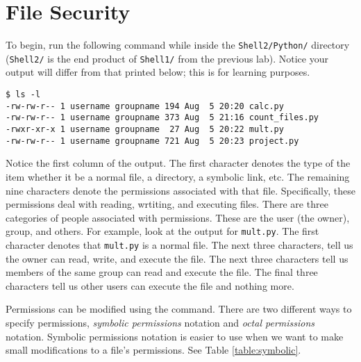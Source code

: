 

\section*{File Security} %

To begin, run the following command while inside the \texttt{Shell2/Python/} directory (\texttt{Shell2/} is the end product of \texttt{Shell1/} from the previous lab).
Notice your output will differ from that printed below; this is for learning purposes.

\begin{lstlisting}
$ ls -l
-rw-rw-r-- 1 username groupname 194 Aug  5 20:20 calc.py
-rw-rw-r-- 1 username groupname 373 Aug  5 21:16 count_files.py
-rwxr-xr-x 1 username groupname  27 Aug  5 20:22 mult.py
-rw-rw-r-- 1 username groupname 721 Aug  5 20:23 project.py
\end{lstlisting}

Notice the first column of the output.
The first character denotes the type of the item whether it be a normal file, a directory, a symbolic link, etc.
The remaining nine characters denote the permissions associated with that file.
Specifically, these permissions deal with reading, wrtiting, and executing files.
There are three categories of people associated with permissions.
These are the user (the owner), group, and others.
For example, look at the output for \texttt{mult.py}.
The first character \li{-} denotes that \texttt{mult.py} is a normal file.
The next three characters,  tell us the owner can read, write, and execute the file.
The next three characters  tell us members of the same group can read and execute the file.
The final three characters  tell us other users can execute the file and nothing more.

Permissions can be modified using the  command.
There are two different ways to specify permissions, \emph{symbolic permissions} notation and \emph{octal permissions} notation.
Symbolic permissions notation is easier to use when we want to make small modifications to a file's permissions.
See Table \ref{table:symbolic}.

